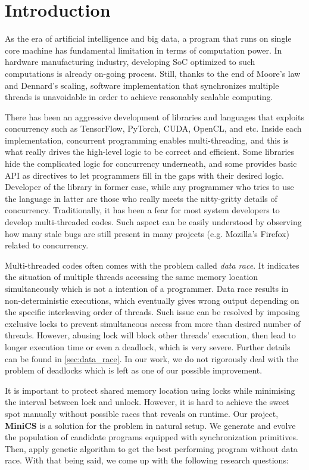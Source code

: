 \section{Introduction}
\label{sec:intro}

As the era of artificial intelligence and big data, a program that runs on single core machine has fundamental limitation in terms of computation power. In hardware manufacturing industry, developing SoC optimized to such computations is already on-going process. Still, thanks to the end of Moore's law and Dennard's scaling, software implementation that synchronizes multiple threads is unavoidable in order to achieve reasonably scalable computing.

There has been an aggressive development of libraries and languages that exploits concurrency such as TensorFlow, PyTorch, CUDA, OpenCL, and etc. Inside each implementation, concurrent programming enables multi-threading, and this is what really drives the high-level logic to be correct and efficient. Some libraries hide the complicated logic for concurrency underneath, and some provides basic API as directives to let programmers fill in the gaps with their desired logic. Developer of the library in former case, while any programmer who tries to use the language in latter are those who really meets the nitty-gritty details of concurrency. Traditionally, it has been a fear for most system developers to develop multi-threaded codes. Such aspect can be easily understood by observing how many stale bugs are still present in many projects (e.g. Mozilla's Firefox) related to concurrency.

Multi-threaded codes often comes with the problem called \textit{data race}. It indicates the situation of multiple threads accessing the same memory location simultaneously which is not a intention of a programmer. Data race results in non-deterministic executions, which eventually gives wrong output depending on the specific interleaving order of threads. Such issue can be resolved by imposing exclusive locks to prevent simultaneous access from more than desired number of threads. However, abusing lock will block other threads' execution, then lead to longer execution time or even a deadlock, which is very severe. Further details can be found in \ref{sec:data_race}. In our work, we do not rigorously deal with the problem of deadlocks which is left as one of our possible improvement.

It is important to protect shared memory location using locks while minimising the interval between lock and unlock. However, it is hard to achieve the sweet spot manually without possible races that reveals on runtime. Our project, \textbf{MiniCS} is a solution for the problem in natural setup. We generate and evolve the population of candidate programs equipped with synchronization primitives. Then, apply genetic algorithm to get the best performing program without data race. With that being said, we come up with the following research questions:

